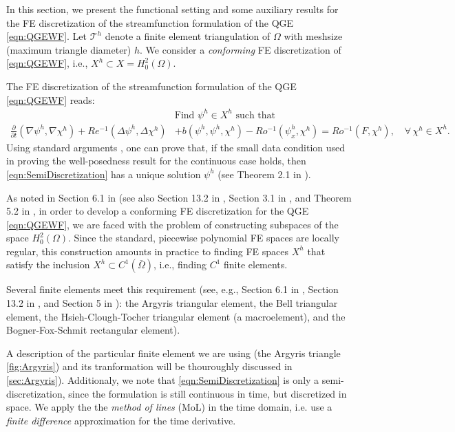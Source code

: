 In this section, we present the functional setting and some auxiliary results
for the FE discretization of the streamfunction formulation of the QGE
\eqref{eqn:QGEWF}. Let $\mathcal{T}^h$ denote a finite element triangulation of
$\Omega$ with meshsize (maximum triangle diameter) $h$. We consider a
\emph{conforming} FE discretization of \eqref{eqn:QGEWF}, i.e., $X^h \subset X
= H_0^2(\Omega)$.

The FE discretization of the streamfunction formulation of the QGE
\eqref{eqn:QGEWF} reads:
\begin{equation}
  \begin{split}
    &\text{Find } \psi^h \in X^h \text{ such that} \\
    \frac{\partial}{\partial t} (\nabla \psi^h, \nabla \chi^h)
      + Re^{-1} (\Delta \psi^h, \Delta \chi^h)
      &+ b(\psi^h,\psi^h,\chi^h)
      - Ro^{-1} (\psi_x^h,\chi^h)
      = Ro^{-1}(F,\chi^h),\quad \forall \, \chi^h \in X^h.
    \label{eqn:SemiDiscretization}
  \end{split}
\end{equation}
Using standard arguments \cite{Girault79,Girault86}, one can prove that, if the
small data condition used in proving the well-posedness result for the
continuous case holds, then \eqref{eqn:SemiDiscretization} has a unique solution
$\psi^h$ (see Theorem 2.1 in \cite{Cayco86}).

As noted in Section 6.1 in \cite{Ciarlet} (see also Section 13.2 in
\cite{Gunzburger89}, Section 3.1 in \cite{Johnson}, and Theorem 5.2 in
\cite{Braess}, in order to develop a conforming FE discretization for the QGE
\eqref{eqn:QGEWF}, we are faced with the problem of constructing subspaces of
the space $H^2_0(\Omega)$. Since the standard, piecewise polynomial FE spaces
are locally regular, this construction amounts in practice to finding FE spaces
$X^h$ that satisfy the inclusion $X^h \subset C^1({\bar \Omega})$, i.e., finding
$C^1$ finite elements.

Several finite elements meet this requirement (see, e.g., Section 6.1 in
\cite{Ciarlet}, Section 13.2 in \cite{Gunzburger89}, and Section 5 in
\cite{Braess}): the Argyris triangular element, the Bell triangular element, the
Hsieh-Clough-Tocher triangular element (a macroelement), and the
Bogner-Fox-Schmit rectangular element).

A description of the particular finite element we are using (the Argyris
triangle \autoref{fig:Argyris}) and its tranformation will be thouroughly
discussed in \autoref{sec:Argyris}). Additionaly, we note that
\eqref{eqn:SemiDiscretization} is only a semi-discretization, since the
formulation is still continuous in time, but discretized in space.  We apply the
the \emph{method of lines} (MoL) in the time domain, i.e. use a \emph{finite
difference} approximation for the time derivative.

